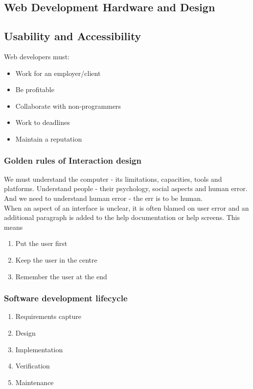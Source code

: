 \documentclass[a4paper]{article}
\theoremstyle{plain}
\theoremstyle{definition}
\newtheorem{defn}{Definition}[section]
\theoremstyle{remark}
\begin{document}
\begin{flushleft}
\section{Web Development Hardware and Design}
\subsection{Usability and Accessibility}
Web developers must:
\begin{itemize}
	\item Work for an employer/client
	\item Be profitable
	\item Collaborate with non-programmers
	\item Work to deadlines
	\item Maintain a reputation
\end{itemize}
\subsubsection{Golden rules of Interaction design}
We must understand  the computer - its limitations, capacities, tools and platforms. Understand people - their psychology, social aspects and human error. And we need to understand human error - the err is to be human. \\
When an aspect of an interface is unclear, it is often blamed on user error and an additional paragraph is added to the help documentation or help screens. 
This means
\begin{tcolorbox}[colback=black!3!white,colframe=black!60!white,title=\begin{defn}User-centered design \label{User-centered design}\end{defn}]

\begin{enumerate}
	\item Put the user first
	\item Keep the user in the centre
	\item Remember the user at the end
\end{enumerate}
\end{tcolorbox}
\subsubsection{Software development lifecycle}
\begin{enumerate}
	\item Requirements capture
	\item Design
	\item Implementation
	\item Verification
	\item Maintenance
\end{enumerate}

\end{flushleft}
\end{document}

